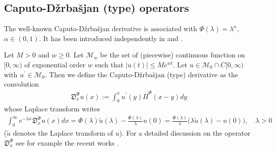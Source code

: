 \documentclass[11pt,a4paper]{article}
\theoremstyle{plain}
\theoremstyle{definition}
\theoremstyle{remark}
\begin{document}
	
	\subsection{Caputo-D\v{z}rba\v{s}jan (type) operators}
	
	The well-known Caputo-D\v{z}rba\v{s}jan derivative is associated with $\Phi(\lambda)=\lambda^\alpha$, $\alpha \in (0,1)$. It has been introduced independently in \cite{caputoBook, CapMai71,CapMai71b} and \cite{Dzh66, DzhNers68}. 
	
	Let $M>0$ and $w\geq 0$. Let $\mathcal{M}_w$ be the set of (piecewise) continuous function on $[0, \infty)$ of exponential order $w$ such that $\vert u(t)\vert \leq M e^{wt}$. Let $u \in \mathcal{M}_0 \cap C[0,\infty)$ with $u^\prime \in \mathcal{M}_0$. Then we define the Caputo-D\v{z}rba\v{s}jan (type) derivative as the convolution
	\begin{align}
		\label{Caputo}
		\mathfrak{D}_{x}^\Phi u(x):=\int_0^x u^\prime (y) \overline{\Pi}^\Phi(x-y) dy
	\end{align}
	whose Laplace transform writes
	\begin{align}
		\label{LapCaputo}
		\int_0^\infty e^{-\lambda x}  \mathfrak{D}_{x}^\Phi u(x) dx= \Phi(\lambda) \widetilde{u}(\lambda)- \frac{\Phi(\lambda)}{\lambda} u(0) = \frac{\Phi(\lambda)}{\lambda} \big( \lambda \widetilde{u}(\lambda) - u(0) \big), \quad \lambda > 0
	\end{align}
	($\widetilde{u}$ denotes the Laplace transform of $u$). For a detailed discussion on the operator $\mathfrak{D}^\Phi_{x}$ see for example the recent works \cite{kochubei2011general, toaldo2015convolution, chen2017time}.
	
\end{document}
